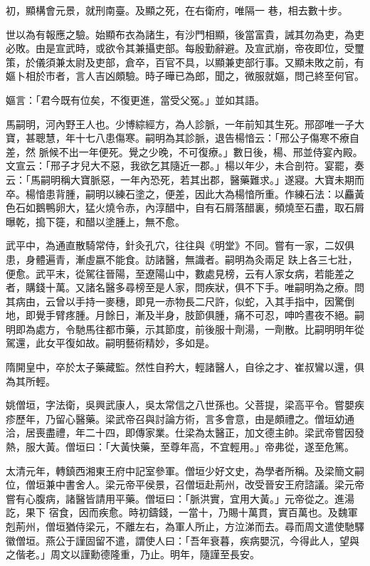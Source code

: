 \begin{pinyinscope}
 初，顯構會元景，就刑南臺。及顯之死，在右衛府，唯隔一
 巷，相去數十步。



 世以為有報應之驗。始顯布衣為諸生，有沙門相顯，後當富貴，誡其勿為吏，為吏必敗。由是宣武時，或欲令其兼攝吏部。每殷勤辭避。及宣武崩，帝夜即位，受璽策，於儀須兼太尉及吏部，倉卒，百官不具，以顯兼吏部行事。又顯未敗之前，有嫗卜相於市者，言人吉凶頗驗。時子曄已為郎，聞之，微服就嫗，問己終至何官。



 嫗言：「君今既有位矣，不復更進，當受父冤。」並如其語。



 馬嗣明，河內野王人也。少博綜經方，為人診脈，一年前知其生死。邢邵唯一子大寶，甚聰慧，年十七八患傷寒。嗣明為其診脈，退告楊愔云：「邢公子傷寒不療自差，然
 脈候不出一年便死。覺之少晚，不可復療。」數日後，楊、邢並侍宴內殿。文宣云：「邢子才兒大不惡，我欲乞其隨近一郡。」楊以年少，未合剖符。宴罷，奏云：「馬嗣明稱大寶脈惡，一年內恐死，若其出郡，醫藥難求。」遂寢。大寶未期而卒。楊愔患背腫，嗣明以練石塗之，便差，因此大為楊愔所重。作練石法：以麤黃色石如鵝鴨卵大，猛火燒令赤，內淳醋中，自有石屑落醋裏，頻燒至石盡，取石屑曝乾，搗下簁，和醋以塗腫上，無不愈。



 武平中，為通直散騎常侍，針灸孔穴，往往與《明堂》不同。嘗有一家，二奴俱患，身體遍青，漸虛嬴不能食。訪諸醫，無識者。嗣明為灸兩足
 趺上各三七壯，便愈。武平末，從駕往晉陽，至遼陽山中，數處見榜，云有人家女病，若能差之者，購錢十萬。又諸名醫多尋榜至是人家，問疾狀，俱不下手。唯嗣明為之療。問其病由，云曾以手持一麥穗，即見一赤物長二尺許，似蛇，入其手指中，因驚倒地，即覺手臂疼腫。月餘日，漸及半身，肢節俱腫，痛不可忍，呻吟晝夜不絕。嗣明即為處方，令馳馬往都市藥，示其節度，前後服十劑湯，一劑散。比嗣明明年從駕還，此女平復如故。嗣明藝術精妙，多如是。



 隋開皇中，卒於太子藥藏監。然性自矜大，輕諸醫人，自徐之才、崔叔鸞以還，俱為其所輕。



 姚僧垣，字法衛，吳興武康人，吳太常信之八世孫也。父菩提，梁高平令。嘗嬰疾疹歷年，乃留心醫藥。梁武帝召與討論方術，言多會意，由是頗禮之。僧垣幼通洽，居喪盡禮，年二十四，即傳家業。仕梁為太醫正，加文德主帥。梁武帝嘗因發熱，服大黃。僧垣曰：「大黃快藥，至尊年高，不宜輕用。」帝弗從，遂至危篤。



 太清元年，轉鎮西湘東王府中記室參軍。僧垣少好文史，為學者所稱。及梁簡文嗣位，僧垣兼中書舍人。梁元帝平侯景，召僧垣赴荊州，改受晉安王府諮議。梁元帝嘗有心腹病，諸醫皆請用平藥。僧垣曰：「脈洪實，宜用大黃。」元帝從之。進湯訖，果下
 宿食，因而疾愈。時初鑄錢，一當十，乃賜十萬貫，實百萬也。及魏軍剋荊州，僧垣猶侍梁元，不離左右，為軍人所止，方泣涕而去。尋而周文遣使馳驛徽僧垣。燕公于謹固留不遣，謂使人曰：「吾年衰暮，疾病嬰沉，今得此人，望與之偕老。」周文以謹勳德隆重，乃止。明年，隨謹至長安。




\end{pinyinscope}
